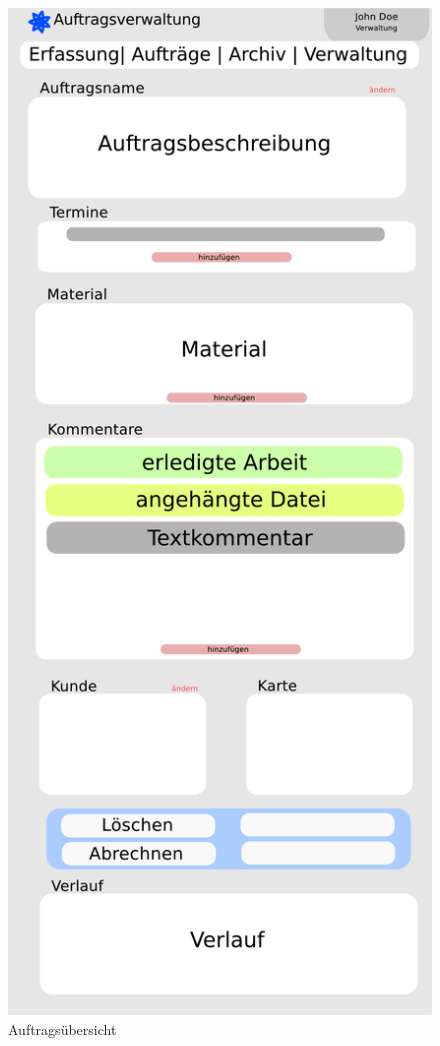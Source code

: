 \documentclass[ngerman, 12pt, pdftex]{scrartcl}[2006/07/30]
\begin{document}
\begin{figure}[p]
\begin{minipage}{0.4\textwidth}
 	\end{minipage}\hfill
    \begin{minipage}{0.4\textwidth}
   		\centering
   		\includegraphics[scale=0.3]{./design/change_order.pdf}
		\caption{Auftragsübersicht}
	\end{minipage} 
	
\end{figure}
\end{document}
